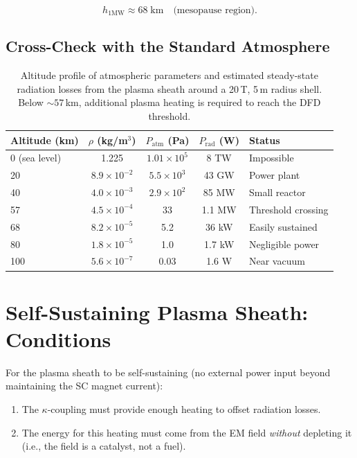 \documentclass[12pt,a4paper]{article}
\begin{document}
\begin{equation}
  \boxed{h_{1\text{MW}} \approx 68 \; \text{km} \quad \text{(mesopause region).}}
\end{equation}

\subsection{Cross-Check with the Standard Atmosphere}

\begin{table}[h]
\centering
\begin{tabular}{@{}lcccl@{}}
\toprule
Altitude (km) & $\rho$ (kg/m$^3$) & $P_{\text{atm}}$ (Pa) & $P_{\text{rad}}$ (W) & Status \\
\midrule
0 (sea level) & 1.225 & $1.01\times10^5$ & 8 TW & Impossible \\
20 & $8.9\times10^{-2}$ & $5.5\times10^3$ & 43 GW & Power plant \\
40 & $4.0\times10^{-3}$ & $2.9\times10^2$ & 85 MW & Small reactor \\
57 & $4.5\times10^{-4}$ & 33 & 1.1 MW & Threshold crossing \\
68 & $8.2\times10^{-5}$ & 5.2 & 36 kW & Easily sustained \\
80 & $1.8\times10^{-5}$ & 1.0 & 1.7 kW & Negligible power \\
100 & $5.6\times10^{-7}$ & 0.03 & 1.6 W & Near vacuum \\
\bottomrule
\end{tabular}
\caption{Altitude profile of atmospheric parameters and estimated steady-state radiation
losses from the plasma sheath around a 20\,T, 5\,m radius shell.  Below $\sim 57$\,km,
additional plasma heating is required to reach the DFD threshold.}
\label{tab:altitude}
\end{table}

\section{Self-Sustaining Plasma Sheath: Conditions}
\label{sec:selfsustain}

For the plasma sheath to be self-sustaining (no external power input beyond maintaining
the SC magnet current):

\begin{enumerate}
  \item The $\kappa$-coupling must provide enough heating to offset radiation losses.
  \item The energy for this heating must come from the EM field \emph{without} depleting it
        (i.e., the field is a catalyst, not a fuel).
\end{enumerate}
\end{document}
